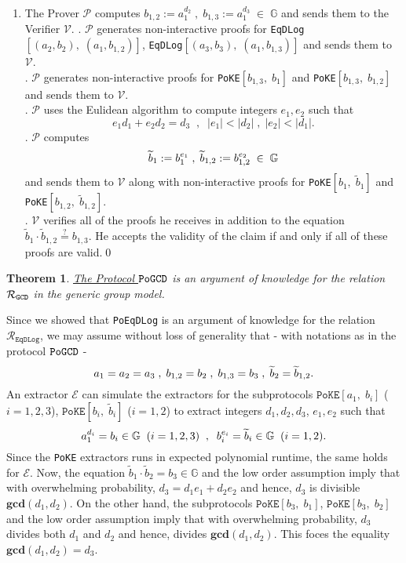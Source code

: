 \documentclass[11pt, lettersize, notitlepage, leqno, footskip=0.6cm]{article}
\newcommand{\ttt}{\texttt}
\newcommand{\bG}{\mathbb{G}}
\newcommand{\wti}{\widetilde}
\newcommand{\mc}{\mathcal}
\newcommand{\mbf}{\mathbf}
\newcommand{\mP}{\mc{P}}
\newcommand{\V}{\mc{V}}
\newcommand{\vs}{\vspace{-0.15cm}}
\newcommand{\noin}{\noindent}
\newcommand{\op}{overwhelming probability}
\newcommand{\GCD}{\mbf{gcd}}
\newcommand{\E}{\mc{E}}
\newtheorem{Thm}{Theorem}[section]
\numberwithin{equation}{section}
\begin{document}
\begin{enumerate}[wide, labelwidth=!, labelindent=0pt]\vs \item The Prover $\mc{P}$ computes $b_{1,2}:= a_1^{d_2}\;,\; b_{1,3}:= a_1^{d_3}\;\in\;\bG$ and sends them to the Verifier $\V$.
\noin 2. $\mP$ generates non-interactive proofs for \verb|EqDLog|$[(a_2, b_2),\; (a_1, b_{1,2})]$, \verb|EqDLog|$[(a_3, b_3),\; (a_1, b_{1,3})]$ and sends them to $\mc{V}$.\\
\noin 3. $\mc{P}$ generates non-interactive proofs for \verb|PoKE|$[b_{1,3},\;b_1 ]$ and \verb|PoKE|$[b_{1,3},\;b_{1,2} ]$ and sends them to $\V$.\\
\noin 4. $\mc{P}$ uses the Eulidean algorithm to compute integers $e_1, e_2$ such that \vs $$e_1d_1 + e_2d_2 = d_3\;\;,\;\; |e_1| < |d_2|\;,\; |e_2| < |d_1|.$$
\noin 5. $\mc{P}$ computes $$\wti{b}_1:= b_1^{e_1}\;,\; \wti{b}_{1,2}:= b_{1,2}^{e_2}\;\in\;\bG \vs $$ and sends them to $\V$ along with non-interactive proofs for \verb|PoKE|$[b_1,\; \wti{b}_1]$ and \verb|PoKE|$[b_{1,2},\; \wti{b}_{1,2}]$.\\
\noin 6. $\mc{V}$ verifies all of the proofs he receives in addition to the equation $\wti{b}_1\cdot \wti{b}_{1,2}\stackrel{?}{=} b_{1,3}$. He accepts the validity of the claim if and only if all of these proofs are valid.\qed \end{enumerate}



\begin{Thm}\label{GCDProof} \hyperlink{GCD}{The Protocol $\tt{PoGCD}$} is an argument of knowledge for the relation $\mc{R}_{{\tt{GCD}}}$ in the generic group model.\end{Thm}

\begin{prf} Since we showed that \verb|PoEqDLog| is an argument of knowledge for the relation $\mc{R}_{\ttt{EqDLog}}$, we may assume without loss of generality that - with notations as in the protocol \hyperlink{GCD}{$\tt{PoGCD}$} - \vs $$a_1 = a_2 = a_3\;,\; {b}_{1,2} = b_2\;,\;{b}_{1,3} = b_3\;,\;\wti{b}_{2} = \wti{b}_{1,2} . \vs $$ An extractor $\E$ can simulate the extractors for the subprotocols $\ttt{PoKE}[a_1,\; b_i]$ ($i=1,2,3$), $\ttt{PoKE}[b_i,\;\wti{b}_i]$ ($i=1,2$) to extract integers $d_1,d_2,d_3$, $e_1,e_2$ such that \vs $$a_1^{d_i} = b_i\in\bG\;\; (i=1,2,3)\;\;,\;\;b_i^{e_i} = \wti{b}_i\in\bG \;\;(i=1,2). \vs $$ Since the \ttt{PoKE} extractors runs in expected polynomial runtime, the same holds for $\E$. Now, the equation $\wti{b}_1\cdot \wti{b}_2 = b_3\in \bG$ and the low order assumption imply that with \op, $d_3 = d_1e_1 + d_2e_2 $ and hence, $d_3$ is divisible $\GCD(d_1,d_2)$. On the other hand, the subprotocols $\ttt{PoKE}[b_3,\;b_1]$, $\ttt{PoKE}[b_3,\;b_2]$ and the low order assumption imply that with \op, $d_3$ divides both $d_1$ and $d_2$ and hence, divides $\GCD(d_1,d_2)$. This foces the equality $\GCD(d_1,d_2) = d_3$.\end{prf}
\end{document}
